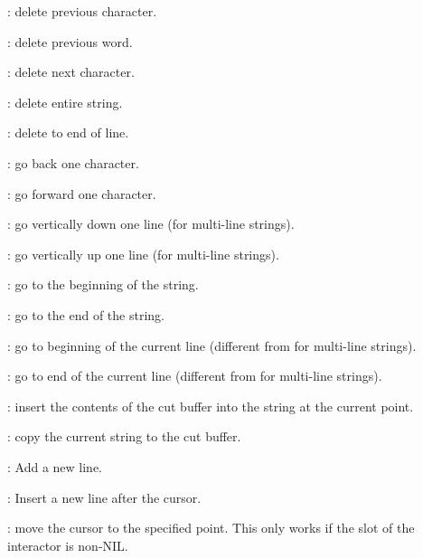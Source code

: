 \begin{description}
\item[] : delete previous character.

\item[] : delete previous word.

\item[] : delete next character.

\item[] : delete entire string.

\item[] : delete to end of line.

\item[] : go back one character.

\item[] : go forward one character.

\item[] : go vertically down one line (for multi-line strings).

\item[] : go vertically up one line (for multi-line strings).

\item[] : go to the beginning of the string.

\item[] : go to the end of the string.

\item[] : go to beginning of the current line (different from  for
multi-line strings).

\item[] : go to end of the current line (different from  for
multi-line strings).

\item[] : insert the contents of the cut buffer into the string at the
current point.

\item[] : copy the current string to the cut buffer.

\item[] : Add a new line.

\item[] : Insert a new line after the cursor.

\item[] : move the cursor to the
specified point.  This only works if the  slot of
the interactor is non-NIL.
\end{description}


